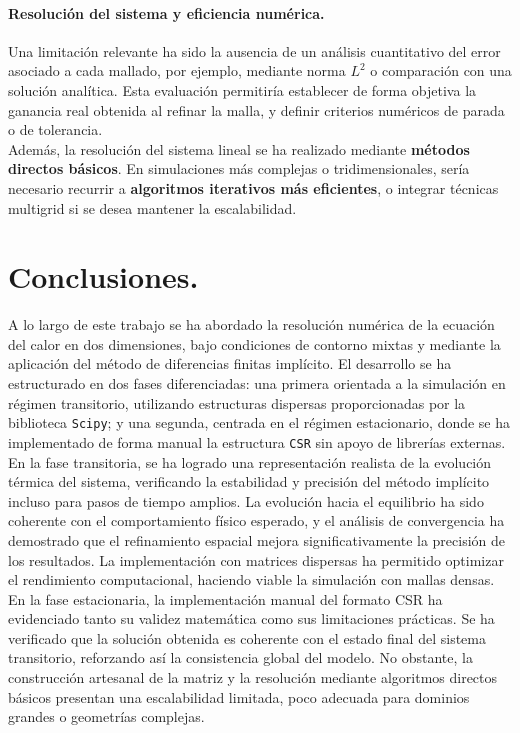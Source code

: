 \documentclass{article}
\begin{document}
\paragraph{Resolución del sistema y eficiencia numérica.} Una limitación relevante ha sido la ausencia de un análisis cuantitativo del error asociado a cada mallado, por ejemplo, mediante norma $L^2$ o comparación con una solución analítica. Esta evaluación permitiría establecer de forma objetiva la ganancia real obtenida al refinar la malla, y definir criterios numéricos de parada o de tolerancia.\\

Además, la resolución del sistema lineal se ha realizado mediante \textbf{métodos directos básicos}. En simulaciones más complejas o tridimensionales, sería necesario recurrir a \textbf{algoritmos iterativos más eficientes}, o integrar técnicas multigrid si se desea mantener la escalabilidad.

\newpage
\section{Conclusiones.}
 A lo largo de este trabajo se ha abordado la resolución numérica de la ecuación del calor en dos dimensiones, bajo condiciones de contorno mixtas y mediante la aplicación del método de diferencias finitas implícito. El desarrollo se ha estructurado en dos fases diferenciadas: una primera orientada a la simulación en régimen transitorio, utilizando estructuras dispersas proporcionadas por la biblioteca \texttt{Scipy}; y una segunda, centrada en el régimen estacionario, donde se ha implementado de forma manual la estructura \texttt{CSR} sin apoyo de librerías externas.\\

En la fase transitoria, se ha logrado una representación realista de la evolución térmica del sistema, verificando la estabilidad y precisión del método implícito incluso para pasos de tiempo amplios. La evolución hacia el equilibrio ha sido coherente con el comportamiento físico esperado, y el análisis de convergencia ha demostrado que el refinamiento espacial mejora significativamente la precisión de los resultados. La implementación con matrices dispersas ha permitido optimizar el rendimiento computacional, haciendo viable la simulación con mallas densas.\\

En la fase estacionaria, la implementación manual del formato CSR ha evidenciado tanto su validez matemática como sus limitaciones prácticas. Se ha verificado que la solución obtenida es coherente con el estado final del sistema transitorio, reforzando así la consistencia global del modelo. No obstante, la construcción artesanal de la matriz y la resolución mediante algoritmos directos básicos presentan una escalabilidad limitada, poco adecuada para dominios grandes o geometrías complejas.\\
\end{document}
